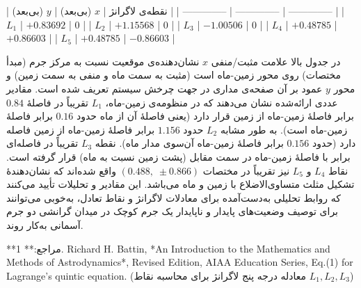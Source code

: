 | نقطه‌ی لاگرانژ | $x$ (بی‌بعد)     | $y$ (بی‌بعد)    |
| -------------- | -------------- | -------------- |
| $L_1$          | $+0.83692$     | $0$            |
| $L_2$          | $+1.15568$     | $0$            |
| $L_3$          | $-1.00506$     | $0$            |
| $L_4$          | $+0.48785$     | $+0.86603$     |
| $L_5$          | $+0.48785$     | $-0.86603$     |

در جدول بالا علامت مثبت/منفی $x$ نشان‌دهنده‌ی موقعیت نسبت به مرکز جرم (مبدأ مختصات) روی محور زمین-ماه است (مثبت به سمت ماه و منفی به سمت زمین) و محور $y$ عمود بر آن صفحه‌ی مداری در جهت چرخش سیستم تعریف شده است. مقادیر عددی ارائه‌شده نشان می‌دهند که در منظومه‌ی زمین-ماه، $L_1$ تقریباً در فاصلهٔ $0.84$ برابر فاصلهٔ زمین-ماه از زمین قرار دارد (یعنی فاصلهٔ آن از ماه حدود $0.16$ برابر فاصلهٔ زمین-ماه است). به طور مشابه $L_2$ حدود $1.156$ برابر فاصلهٔ زمین-ماه از زمین فاصله دارد (حدود $0.156$ برابر فاصلهٔ زمین-ماه آن‌سوی مدار ماه). نقطه $L_3$ تقریباً در فاصله‌ای برابر با فاصلهٔ زمین-ماه در سمت مقابل (پشت زمین نسبت به ماه) قرار گرفته است. نقاط $L_4$ و $L_5$ نیز تقریباً در مختصات $(0.488,\;\pm0.866)$ واقع شده‌اند که نشان‌دهندهٔ تشکیل مثلث متساوی‌الاضلاع با زمین و ماه می‌باشد. این مقادیر و تحلیلات تأیید می‌کنند که روابط تحلیلی به‌دست‌آمده برای معادلات لاگرانژ و نقاط تعادل، به‌خوبی می‌توانند برای توصیف وضعیت‌های پایدار و ناپایدار یک جرم کوچک در میدان گرانشی دو جرم آسمانی به‌کار روند. 

**مراجع:**  
1. Richard H. Battin, *An Introduction to the Mathematics and Methods of Astrodynamics*, Revised Edition, AIAA Education Series, Eq.(1) for Lagrange’s quintic equation. (معادله درجه پنج لاگرانژ برای محاسبه نقاط $L_1, L_2, L_3$)
